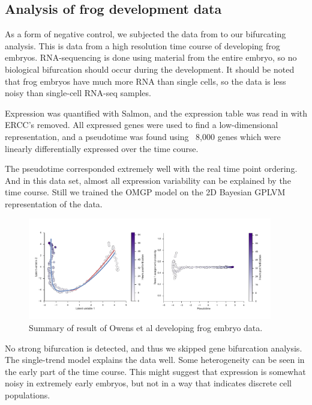 \subsection{Analysis of frog development data}

As a form of negative control, we subjected the data from \cite{Owens2016-op} to our bifurcating analysis. This is data from a high resolution time course of developing frog embryos. RNA-sequencing is done using material from the entire embryo, so no biological bifurcation should occur during the development. It should be noted that frog embryos have much more RNA than single cells, so the data is less noisy than single-cell RNA-seq samples.

Expression was quantified with Salmon, and the expression table was read in with ERCC's removed. All expressed genes were used to find a low-dimensional representation, and a pseudotime was found using ~8,000 genes which were linearly differentially expressed over the time course.

The pseudotime corresponded extremely well with the real time point ordering. And in this data set, almost all expression variability can be explained by the time course. Still we trained the OMGP model on the 2D Bayesian GPLVM representation of the data.

\begin{figure}
    \centering
    \includegraphics[width=0.95\textwidth]{frog-illustration.pdf}
    \caption{Summary of  result of Owens et al developing frog embryo data.}
    \label{fig:owens}
\end{figure}

No strong bifurcation is detected, and thus we skipped gene bifurcation analysis. The single-trend model explains the data well. Some heterogeneity can be seen in the early part of the time course. This might suggest that expression is somewhat noisy in extremely early embryos, but not in a way that indicates discrete cell populations.

